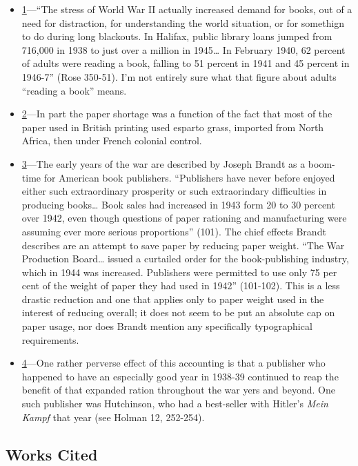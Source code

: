 \documentclass[
  12pt,
]{article}
\begin{document}
\begin{itemize}
\item
  \protect\hyperlink{tvh-ref1}{1}---``The stress of World War II
  actually increased demand for books, out of a need for distraction,
  for understanding the world situation, or for somethign to do during
  long blackouts. In Halifax, public library loans jumped from 716,000
  in 1938 to just over a million in 1945\ldots{} In February 1940, 62
  percent of adults were reading a book, falling to 51 percent in 1941
  and 45 percent in 1946-7'' (Rose 350-51). I'm not entirely sure what
  that figure about adults ``reading a book'' means.
\item
  \protect\hyperlink{tvh-ref2}{2}---In part the paper shortage was a
  function of the fact that most of the paper used in British printing
  used esparto grass, imported from North Africa, then under French
  colonial control.
\item
  \protect\hyperlink{tvh-ref3}{3}---The early years of the war are
  described by Joseph Brandt as a boom-time for American book
  publishers. ``Publishers have never before enjoyed either such
  extraordinary prosperity or such extraorindary difficulties in
  producing books\ldots{} Book sales had increased in 1943 form 20 to 30
  percent over 1942, even though questions of paper rationing and
  manufacturing were assuming ever more serious proportions'' (101). The
  chief effects Brandt describes are an attempt to save paper by
  reducing paper weight. ``The War Production Board\ldots{} issued a
  curtailed order for the book-publishing industry, which in 1944 was
  increased. Publishers were permitted to use only 75 per cent of the
  weight of paper they had used in 1942'' (101-102). This is a less
  drastic reduction and one that applies only to paper weight used in
  the interest of reducing overall; it does not seem to be put an
  absolute cap on paper usage, nor does Brandt mention any specifically
  typographical requirements.
\item
  \protect\hyperlink{tvh-ref4}{4}---One rather perverse effect of this
  accounting is that a publisher who happened to have an especially good
  year in 1938-39 continued to reap the benefit of that expanded ration
  throughout the war yers and beyond. One such publisher was Hutchinson,
  who had a best-seller with Hitler's \emph{Mein Kampf} that year (see
  Holman 12, 252-254).
\end{itemize}

\hypertarget{works-cited}{%
\subsection{Works Cited}\label{works-cited}}
\end{document}
